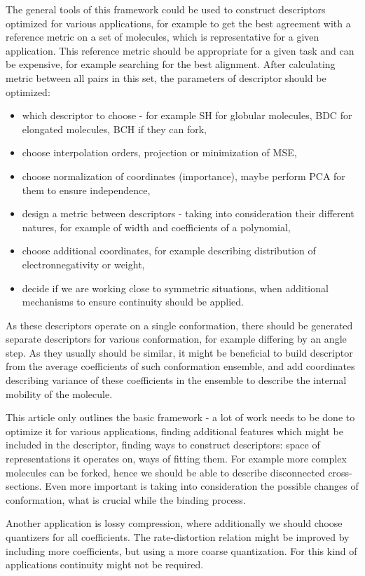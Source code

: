 \documentclass[10pt,journal]{IEEEtranTCOM}
\theoremstyle{plain}
\begin{document}
The general tools of this framework could be used to construct descriptors optimized for various applications, for example to get the best agreement with a reference metric on a set of molecules, which is representative for a given application. This reference metric should be appropriate for a given task and can be expensive, for example searching for the best alignment.
After calculating metric between all pairs in this set, the parameters of descriptor should be optimized:
\begin{itemize}
  \item which descriptor to choose - for example SH for globular molecules, BDC for elongated molecules, BCH if they can fork,
  \item choose interpolation orders, projection or minimization of MSE,
  \item choose normalization of coordinates (importance), maybe perform PCA for them to ensure independence, 
  \item design a metric between descriptors - taking into consideration their different natures, for example of width and coefficients of a polynomial,
  \item choose additional coordinates, for example describing distribution of electronnegativity or weight,
  \item decide if we are working close to symmetric situations, when additional mechanisms to ensure continuity should be applied.
\end{itemize}
As these descriptors operate on a single conformation, there should be generated separate descriptors for various conformation, for example differing by an angle step. As they usually should be similar, it might be beneficial to build descriptor from the average coefficients of such conformation ensemble, and add coordinates describing variance of these coefficients in the ensemble to describe the internal mobility of the molecule.

This article only outlines the basic framework - a lot of work needs to be done to optimize it for various applications, finding additional features which might be included in the descriptor, finding ways to construct descriptors: space of representations it operates on, ways of fitting them. For example more complex molecules can be forked, hence we should be able to describe disconnected cross-sections. Even more important is taking into consideration the possible changes of conformation, what is crucial while the binding process.

Another application is lossy compression, where additionally we should choose quantizers for all coefficients. The rate-distortion relation might be improved by including more coefficients, but using a more coarse quantization. For this kind of applications continuity might not be required.



\end{document}
